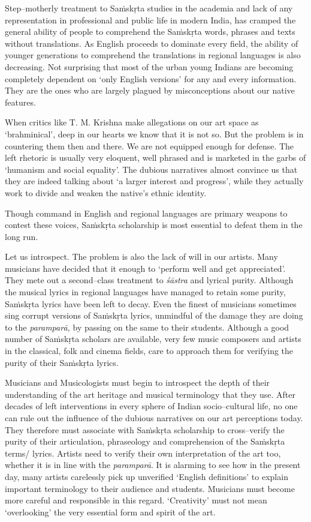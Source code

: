 Step–motherly treatment to Saṁskṛta studies in the academia and lack of any representation in professional and public life in modern India, has cramped the general ability of people to comprehend the Saṁskṛta words, phrases and texts without translations. As English proceeds to dominate every field, the ability of younger generations to comprehend the translations in regional languages is also decreasing. Not surprising that most of the urban young Indians are becoming completely dependent on ‘only English versions’ for any and every information. They are the ones who are largely plagued by misconceptions about our native features.

When critics like T. M. Krishna make allegations on our art space as ‘brahminical’, deep in our hearts we know that it is not so. But the problem is in countering them then and there. We are not equipped enough for defense. The left rhetoric is usually very eloquent, well phrased and is marketed in the garbs of ‘humanism and social equality’. The dubious narratives almost convince us that they are indeed talking about ‘a larger interest and progress’, while they actually work to divide and weaken the native’s ethnic identity.

Though command in English and regional languages are primary weapons to contest these voices, Saṁskṛta scholarship is most essential to defeat them in the long run.

Let us introspect. The problem is also the lack of will in our artists. Many musicians have decided that it enough to ‘perform well and get appreciated’. They mete out a second–class treatment to \textit{śāstra} and lyrical purity. Although the musical lyrics in regional languages have managed to retain some purity, Saṁskṛta lyrics have been left to decay. Even the finest of musicians sometimes sing corrupt versions of Saṁskṛta lyrics, unmindful of the damage they are doing to the \textit{paramparā,} by passing on the same to their students. Although a good number of Saṁskṛta scholars are available, very few music composers and artists in the classical, folk and cinema fields, care to approach them for verifying the purity of their Saṁskṛta lyrics.

Musicians and Musicologists must begin to introspect the depth of their understanding of the art heritage and musical terminology that they use. After decades of left interventions in every sphere of Indian socio–cultural life, no one can rule out the influence of the dubious narratives on our art perceptions today. They therefore must associate with Saṁskṛta scholarship to cross–verify the purity of their articulation, phraseology and comprehension of the Saṁskṛta terms/ lyrics. Artists need to verify their own interpretation of the art too, whether it is in line with the \textit{paramparā}. It is alarming to see how in the present day, many artists carelessly pick up unverified ‘English definitions’ to explain important terminology to their audience and students. Musicians must become more careful and responsible in this regard. ‘Creativity’ must not mean ‘overlooking’ the very essential form and spirit of the art.

